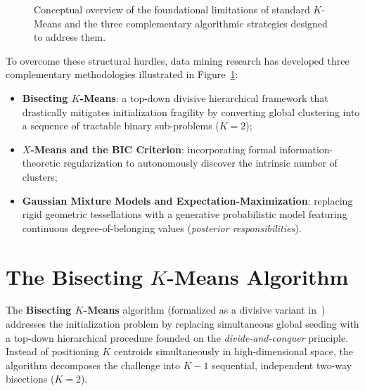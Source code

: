 \begin{figure}[htbp]
\caption{Conceptual overview of the foundational limitations of standard $K$-Means and the three complementary algorithmic strategies designed to address them.}
\label{fig:dm-kmeans-limits-overview}
\end{figure}

To overcome these structural hurdles, data mining research has developed three complementary methodologies illustrated in Figure~\ref{fig:dm-kmeans-limits-overview}:
\begin{itemize}
    \item \textbf{Bisecting $K$-Means}: a top-down divisive hierarchical framework that drastically mitigates initialization fragility by converting global clustering into a sequence of tractable binary sub-problems ($K=2$);
    \item \textbf{$X$-Means and the BIC Criterion}: incorporating formal information-theoretic regularization to autonomously discover the intrinsic number of clusters;
    \item \textbf{Gaussian Mixture Models and Expectation-Maximization}: replacing rigid geometric tessellations with a generative probabilistic model featuring continuous degree-of-belonging values (\textit{posterior responsibilities}).
\end{itemize}

\section{The Bisecting \texorpdfstring{$K$}{K}-Means Algorithm}
\label{sec:dm-bisecting-kmeans}

The \textbf{Bisecting $K$-Means} algorithm (formalized as a divisive variant in~\cite{tan2018}) addresses the initialization problem by replacing simultaneous global seeding with a top-down hierarchical procedure founded on the \textit{divide-and-conquer} principle. Instead of positioning $K$ centroids simultaneously in high-dimensional space, the algorithm decomposes the challenge into $K-1$ sequential, independent two-way bisections ($K=2$).

